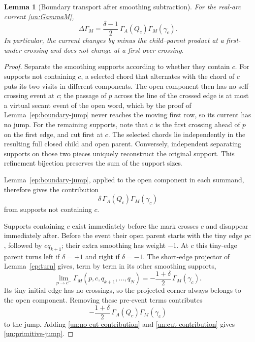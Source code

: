 \documentclass[11pt,letterpaper]{article}
\numberwithin{equation}{section}
\newtheorem{lemma}[theorem]{Lemma}
\theoremstyle{definition}
\theoremstyle{remark}
\begin{document}
\begin{lemma}[Boundary transport after smoothing subtraction]
\label{un:transport-lemma}
For the real-arc current \eqref{un:GammaM},
\begin{equation}
 \Delta\Gamma_M
   =\frac{\delta-1}{2}\,
       \Gamma_A(Q_c)\Gamma_M(\gamma_c).
 \label{un:primitive-jump}
\end{equation}
In particular, the current changes by minus the child--parent product
at a first-under crossing and does not change at a first-over crossing.
\end{lemma}

\begin{proof}
Separate the smoothing supports according to whether they contain $c$.
For supports not containing $c$, a selected chord that alternates with
the chord of $c$ puts its two visits in different components.  The open
component then has no self-crossing event at $c$; the passage of $p$
across the line of the crossed edge is at most a virtual secant event of
the open word, which by the proof of Lemma~\ref{ep:boundary-jump} never
reaches the moving first row, so its current has no jump.  For the
remaining supports, note that $c$ is the first crossing ahead of $p$ on
the first edge, and cut first at $c$.  The selected
chords lie independently in the resulting full closed child and open
parent.  Conversely, independent separating supports on those two
pieces uniquely reconstruct the original support.  This refinement
bijection preserves the sum of the support sizes.

Lemma~\ref{ep:boundary-jump}, applied to the open component in each
summand, therefore gives the contribution
\begin{equation}
 \delta\,\Gamma_A(Q_c)\Gamma_M(\gamma_c)
 \label{un:no-cut-contribution}
\end{equation}
from supports not containing $c$.

Supports containing $c$ exist immediately before the mark crosses $c$
and disappear immediately after.  Before the event their open parent
starts with the tiny edge $pc$, followed by $cq_{k+1}$; their extra
smoothing has weight $-1$.  At $c$ this tiny-edge parent turns left if
$\delta=+1$ and right if $\delta=-1$.  The short-edge projector of
Lemma~\ref{ep:turn} gives, term by term in its other smoothing supports,
\begin{equation}
 \lim_{p\to c^-}\Gamma_M(p,c,q_{k+1},\ldots,q_N)
   =-\frac{1+\delta}{2}\,\Gamma_M(\gamma_c).
 \label{un:tiny-parent}
\end{equation}
Its tiny initial edge has no crossings, so the projected corner always
belongs to the open component.  Removing these pre-event terms
contributes
\begin{equation}
 -\frac{1+\delta}{2}\,
       \Gamma_A(Q_c)\Gamma_M(\gamma_c)
 \label{un:cut-contribution}
\end{equation}
to the jump.  Adding \eqref{un:no-cut-contribution} and
\eqref{un:cut-contribution} gives \eqref{un:primitive-jump}.


\end{proof}
\end{document}
